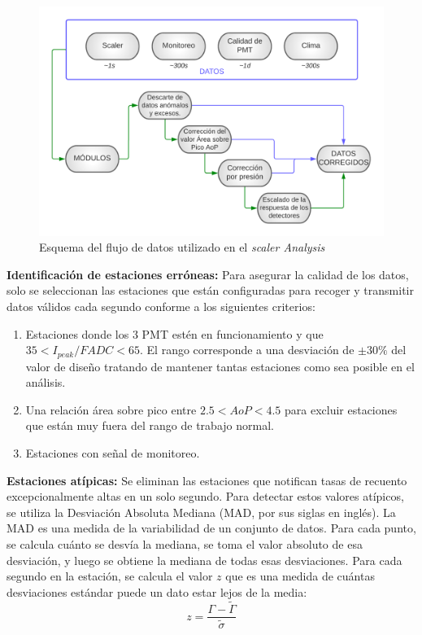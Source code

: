 \begin{figure}
\centering
    \includegraphics[width=0.7\linewidth]{Figs/scaler.png}
    \caption{Esquema del flujo de datos utilizado en el \textit{scaler Analysis}}
    \label{esquema_datos}
\end{figure}
\textbf{Identificación de estaciones erróneas:} Para asegurar la calidad de los datos, solo se seleccionan las estaciones que están configuradas para recoger y transmitir datos válidos cada segundo conforme a los siguientes criterios:
\begin{enumerate}
    \item Estaciones donde los 3 PMT estén en funcionamiento y que $35 < I_{peak}/FADC < 65$. El rango corresponde a una desviación de $\pm30\%$ del valor de diseño tratando de mantener tantas estaciones como sea posible en el análisis.
    \item Una relación área sobre pico entre $2.5 < AoP < 4.5$ para excluir estaciones que están muy fuera del rango de trabajo normal.
    \item Estaciones con señal de monitoreo.
\end{enumerate}

\textbf{Estaciones atípicas:} Se eliminan las estaciones que notifican tasas de recuento excepcionalmente altas en un solo segundo. Para detectar estos valores atípicos, se utiliza la Desviación Absoluta Mediana (MAD, por sus siglas en inglés). La MAD es una medida de la variabilidad de un conjunto de datos. Para cada punto, se calcula cuánto se desvía la mediana, se toma el valor absoluto de esa desviación, y luego se obtiene la mediana de todas esas desviaciones. Para cada segundo en la estación, se calcula el valor $z$ que es una medida de cuántas desviaciones estándar puede un dato estar lejos de la media:
\begin{equation}
    z=\frac{\Gamma-\tilde{\Gamma}}{\tilde{\sigma}}
\end{equation}


